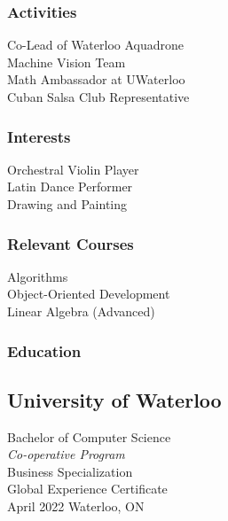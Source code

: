 \documentclass{mxresume}
\begin{document}
\begin{minipage}[t]{0.25\textwidth}
\begin{sidebar}
\subsubsection*{Activities}
Co-Lead of Waterloo Aquadrone \\
Machine Vision Team\\[1mm]
Math Ambassador at UWaterloo \\[1mm]
Cuban Salsa Club Representative
\subsubsection*{Interests}
Orchestral Violin Player \\[1mm]
Latin Dance Performer \\[1mm]
Drawing and Painting
\subsubsection*{Relevant Courses}
Algorithms \\[1mm]
Object-Oriented Development \\[1mm]
Linear Algebra (Advanced)
\subsubsection*{Education}
\subsection*{University of Waterloo} 
Bachelor of Computer Science \\
\textit{Co-operative Program} \\[1.2mm]
\tab Business Specialization \\
\tab Global Experience Certificate \\[2mm]
April 2022 \GBar Waterloo, ON 
\end{sidebar}
\end{minipage}
\end{document}
